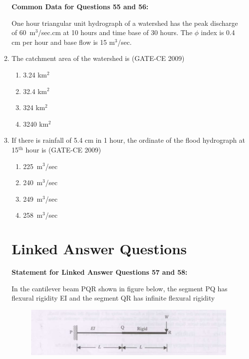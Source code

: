\documentclass[journal,12pt,onecolumn]{article}
\theoremstyle{remark}
\begin{document}
\begin{enumerate}
\textbf{Common Data for Questions 55 and 56:}

One hour triangular unit hydrograph of a watershed has the peak discharge of 60~m$^3$/sec.cm at 10 hours and time base of 30 hours. The $\phi$ index is 0.4 cm per hour and base flow is 15 m$^3$/sec.

    \item The catchment area of the watershed is (GATE-CE 2009)
    \begin{multicols}{2}
    \begin{enumerate}
        \item 3.24 km$^2$ 
        \item 32.4 km$^2$ 
        \item 324 km$^2$ 
        \item 3240 km$^2$
    \end{enumerate}
\end{multicols}
    
    \item If there is rainfall of 5.4 cm in 1 hour, the ordinate of the flood hydrograph at 15$^\text{th}$ hour is (GATE-CE 2009)
    \begin{multicols}{2}
    \begin{enumerate}
        \item 225~m$^3$/sec 
        \item 240~m$^3$/sec 
        \item 249~m$^3$/sec 
        \item 258~m$^3$/sec
    \end{enumerate}
\end{multicols}

\section*{Linked Answer Questions}
\textbf{Statement for Linked Answer Questions 57 and 58:}

In the cantilever beam PQR shown in figure below, the segment PQ has flexural rigidity EI and the segment QR has infinite flexural rigidity
    \begin{figure}[H]
    \centering
    \includegraphics[width=0.7\columnwidth]{figs/image6.jpg}
    \caption{}
    \label{fig:placeholder}
    \end{figure}
    

\end{enumerate}
\end{document}
